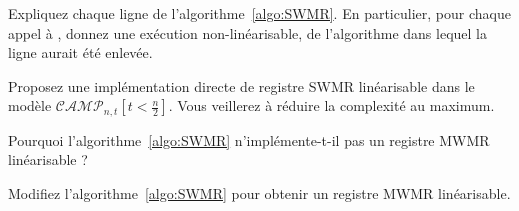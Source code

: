 \begin{exercice}
  \begin{questions}
  \item Expliquez chaque ligne de l'algorithme~\ref{algo:SWMR}. En particulier, pour chaque appel à , 
    donnez une exécution non-linéarisable, de l'algorithme dans lequel la ligne aurait été enlevée.
  \item Proposez une implémentation directe de registre SWMR linéarisable dans le modèle \linebreak $\mathcal{CAMP}_{n, t}[t<\frac{n}{2}]$.
    Vous veillerez à réduire la complexité au maximum. 
  \item Pourquoi l'algorithme~\ref{algo:SWMR} n'implémente-t-il pas un registre MWMR linéarisable ? 
  \item Modifiez l'algorithme~\ref{algo:SWMR} pour obtenir un registre MWMR linéarisable.
  \end{questions}
\end{exercice}

\endgroup
\endinput

